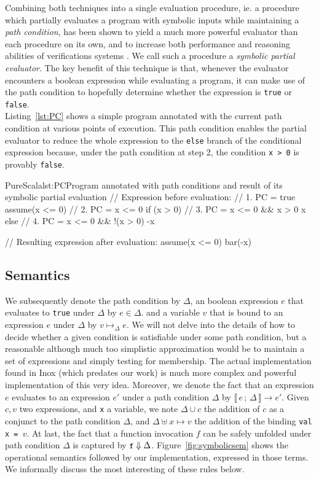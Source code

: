 \documentclass[a4paper,twoside]{article}
\newcommand{\lb}[2]{\llbracket\, #1\,;\, #2\, \rrbracket}
\newcommand{\InlineS}[1]{\lstinline[language=PureScala,basicstyle=\small\ttfamily,columns=fixed]|#1|}
\newcommand{\RefFig}[1]{Figure~\ref{#1}}
\newcommand{\RefCode}[1]{Listing~\ref{#1}}
\newcommand{\stt}[1]{\texttt{\small{#1}}}
\begin{document}
Combining both techniques into a single evaluation procedure, ie. a procedure which partially evaluates a program with symbolic inputs while maintaining a \textit{path condition}, has been shown to yield a much more powerful evaluator than each procedure on its own, and to increase both performance and reasoning abilities of verifications systems \cite{partialsym}. We call such a procedure a \textit{symbolic partial evaluator}. The key benefit of this technique is that, whenever the evaluator encounters a boolean expression while evaluating a program, it can make use of the path condition to hopefully determine whether the expression is \InlineS{true} or \InlineS{false}.\\

\RefCode{lst:PC} shows a simple program annotated with the current path condition at various points of execution. This path condition enables the partial evaluator to reduce the whole expression to the \InlineS{else} branch of the conditional expression  because, under the path condition at step 2, the condition \InlineS{x > 0} is provably \InlineS{false}.

\begin{Code}{PureScala}{lst:PC}{Program annotated with path conditions and result of its symbolic partial evaluation}
// Expression before evaluation:
{
  // 1. PC = true
  assume(x <= 0)
  // 2. PC = x <= 0
  if (x > 0) {
    // 3. PC = x <= 0 && x > 0
    x
  } else {
    // 4. PC = x <= 0 && !(x > 0)
    -x
  }
}

// Resulting expression after evaluation:
{
  assume(x <= 0)
  bar(-x)
}
\end{Code}

\subsection{Semantics}

We subsequently denote the path condition by $\Delta$, an boolean expression $e$ that  evaluates to \InlineS{true} under $\Delta$ by $e \in \Delta$. and a variable $v$ that is bound to an expression $e$ under $\Delta$ by $v \mapsto_\Delta e$. We will not delve into the details of how to decide whether a given condition is satisfiable under some path condition, but a reasonable although much too simplistic approximation would be to maintain a set of expressions and simply testing for membership. The actual implementation found in Inox (which predates our work) is much more complex and powerful implementation of this very idea. Moreover, we denote the fact that an expression $e$ evaluates to an expression $e'$ under a path condition $\Delta$ by $\lb{e}{\Delta} \longrightarrow e'$. Given $c, v$ two expressions, and \stt{x} a variable, we note $\Delta \cup c$ the addition of $c$ as a conjunct to the path condition $\Delta$, and $\Delta \uplus x \mapsto v$ the addition of the binding \stt{val x = $v$}. At last, the fact that a function invocation $f$ can be safely unfolded under path condition $\Delta$ is captured by $\stt{f} \Downarrow \Delta$. \RefFig{fig:symbolicsem} shows the operational semantics followed by our implementation, expressed in those terms. We informally discuss the most interesting of these rules below.
\end{document}
